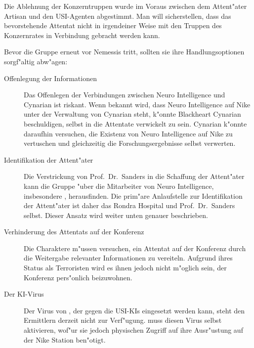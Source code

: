\begin{remarks}
	Die Ablehnung der Konzerntruppen wurde im Voraus zwischen dem Attent"ater Artisan und den USI-Agenten abgestimmt. Man will sicherstellen, dass das bevorstehende Attentat nicht in irgendeiner Weise mit den Truppen des Konzernrates in Verbindung gebracht werden kann.
\end{remarks}


Bevor die Gruppe erneut vor Nemessis tritt, sollten sie ihre Handlungsoptionen sorgf"altig abw"agen:

\begin{description}
	\item[Offenlegung der Informationen] Das Offenlegen der Verbindungen zwischen Neuro Intelligence und Cynarian ist riskant. Wenn bekannt 
		wird, dass Neuro Intelligence auf Nike unter der Verwaltung von Cynarian steht, k"onnte Blackheart Cynarian beschuldigen, selbst in die Attentate verwickelt zu sein. Cynarian k"onnte daraufhin versuchen, die Existenz von Neuro Intelligence auf Nike zu vertuschen und gleichzeitig die Forschungsergebnisse selbst verwerten.
	\item[Identifikation der Attent"ater] Die Verstrickung von Prof.~Dr.~Sanders in die Schaffung der Attent"ater kann die Gruppe "uber die 
		Mitarbeiter von Neuro Intelligence, insbesondere \ml{}, herausfinden. Die prim"are Anlaufstelle zur Identifikation der Attent"ater ist daher das Rondra Hospital und Prof.~Dr.~Sanders selbst. Dieser Ansatz wird weiter unten genauer beschrieben.		
	\item[Verhinderung des Attentats auf der Konferenz] Die Charaktere m"ussen versuchen, ein Attentat auf der Konferenz durch die 
		Weitergabe relevanter Informationen zu vereiteln. Aufgrund ihres Status als Terroristen wird es ihnen jedoch nicht m"oglich sein, der Konferenz pers"onlich beizuwohnen.
	\item[Der KI-Virus] Der Virus von \ml{}, der gegen die USI-KIs eingesetzt werden kann, steht den Ermittlern derzeit nicht zur 
		Verf"ugung. \ml{} muss diesen Virus selbst aktivieren, wof"ur sie jedoch physischen Zugriff auf ihre Ausr"ustung auf der Nike Station ben"otigt.
\end{description}

